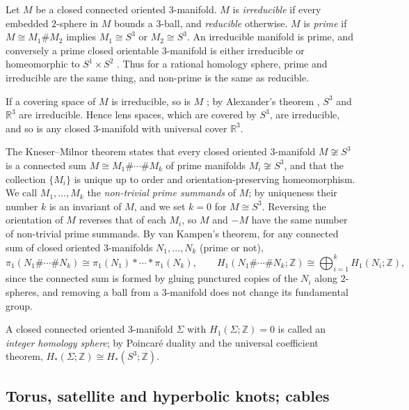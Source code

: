 \documentclass[11pt]{article}
\newcommand{\Z}{\mathbb Z}
\newcommand{\R}{\mathbb R}
\theoremstyle{definition}
\theoremstyle{remark}
\begin{document}
Let \(M\) be a closed connected oriented \(3\)-manifold. \(M\) is
\emph{irreducible} if every embedded \(2\)-sphere in \(M\) bounds a
\(3\)-ball, and \emph{reducible} otherwise. \(M\) is \emph{prime} if
\(M\cong M_1\#M_2\) implies \(M_1\cong S^3\) or \(M_2\cong S^3\). An
irreducible manifold is prime, and conversely a prime closed orientable
\(3\)-manifold is either irreducible or homeomorphic to \(S^1\times S^2\)
\cite[\S1.1]{Hatcher3M}. Thus for a rational homology sphere, prime and
irreducible are the same thing, and non-prime is the same as reducible.

If a covering space of \(M\) is irreducible, so is \(M\)
\cite[Proposition~1.6]{Hatcher3M}; by Alexander's theorem
\cite[\S1.1]{Hatcher3M}, \(S^3\) and \(\R^3\) are irreducible. Hence
lens spaces, which are covered by \(S^3\), are irreducible, and so is
any closed \(3\)-manifold with universal cover \(\R^3\).

The Kneser--Milnor theorem \cite[Theorem~1.5]{Hatcher3M} states that
every closed oriented \(3\)-manifold \(M\not\cong S^3\) is a connected sum
\(M\cong M_1\#\cdots\#M_k\) of prime manifolds \(M_i\not\cong S^3\), and
that the collection \(\{M_i\}\) is unique up to order and
orientation-preserving homeomorphism. We call \(M_1,\dots,M_k\) the
\emph{non-trivial prime summands} of \(M\); by uniqueness their number
\(k\) is an invariant of \(M\), and we set \(k=0\) for \(M\cong S^3\).
Reversing the orientation of \(M\) reverses that of each \(M_i\), so
\(M\) and \(-M\) have the same number of non-trivial prime summands.
By van Kampen's theorem, for any connected sum of closed oriented
\(3\)-manifolds \(N_1,\dots,N_k\) (prime or not),
\begin{equation}\label{eq:vk}
 \pi_1(N_1\#\cdots\#N_k)\cong\pi_1(N_1)*\cdots*\pi_1(N_k),
 \qquad
 H_1(N_1\#\cdots\#N_k;\Z)\cong\bigoplus_{i=1}^k H_1(N_i;\Z),
\end{equation}
since the connected sum is formed by gluing punctured copies of the
\(N_i\) along \(2\)-spheres, and removing a ball from a \(3\)-manifold
does not change its fundamental group.

A closed connected oriented \(3\)-manifold \(\Sigma\) with
\(H_1(\Sigma;\Z)=0\) is called an \emph{integer homology sphere}; by
Poincar\'e duality and the universal coefficient theorem,
\(H_*(\Sigma;\Z)\cong H_*(S^3;\Z)\).

\subsection{Torus, satellite and hyperbolic knots; cables}\label{sec:types}
\end{document}

